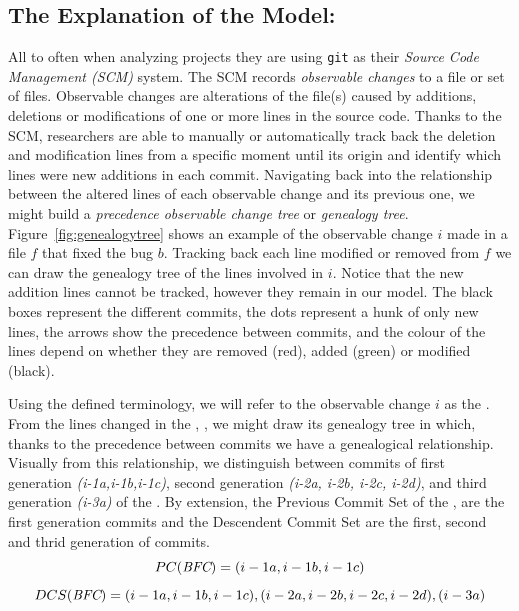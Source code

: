 \documentclass[a4paper, 12pt]{book}
\begin{document}

\subsection{The Explanation of the Model:}
All to often when analyzing projects they are using \texttt{git} as their \textit{Source Code Management (SCM)} system. The SCM records \emph{observable changes} to a file or set of files. Observable changes are alterations of the file(s) caused by additions, deletions or modifications of one or more lines in the source code. Thanks to the SCM, researchers are able to manually or automatically track back the deletion and modification lines from a specific moment until its origin and identify which lines were new additions in each commit. Navigating back into the relationship between the altered lines of each observable change and its previous one, we might build a \emph{precedence observable change tree} or \emph{genealogy tree}. Figure~\ref{fig:genealogytree} shows an example of the observable change $i$ made in a file $f$ that fixed the bug $b$. Tracking back each line modified or removed from $f$ we can draw the genealogy tree of the lines involved in $i$. Notice that the new addition lines cannot be tracked, however they remain in our model. The black boxes represent the different commits, the dots represent a hunk of only new lines, the arrows show the precedence between commits, and the colour of the lines depend on whether they are removed (red), added (green) or modified (black). 

Using the defined terminology, we will refer to the observable change $i$ as the \BFC. From the lines changed in the \BFC, \LC{\BFC}, we might draw its genealogy tree in which, thanks to the precedence between commits we have a genealogical relationship. Visually from this relationship, we distinguish between commits of first generation \emph{(i-1a,i-1b,i-1c)}, second generation \emph{(i-2a, i-2b, i-2c, i-2d)}, and third generation \emph{(i-3a)} of the \BFC. By extension, the Previous Commit Set of the \BFC, are the first generation commits and the Descendent Commit Set are the first, second and thrid generation of commits. 
\[ PC(\emph{BFC}) =  {(i-1a,i-1b,i-1c)}\]
\[ DCS(\emph{BFC}) =  {(i-1a,i-1b,i-1c),(i-2a, i-2b, i-2c, i-2d),(i-3a)}\]
\end{document}
